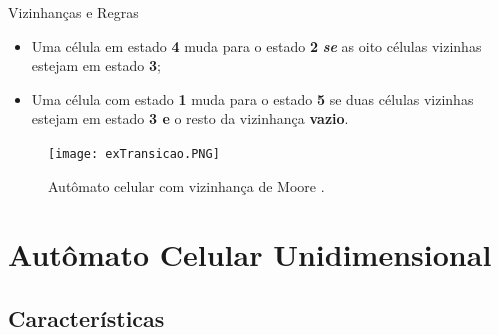 \documentclass[compress, hide notes]{beamer}
\begin{document}
    
\begin{frame}{Vizinhanças e Regras}
	
	\begin{minipage}[t]{0.38\linewidth}\centering

        \begin{itemize}

              \item Uma célula em estado \textbf{4}
              muda para o estado \textbf{2}
              \textit{\textbf{se}} as oito células vizinhas estejam em estado \textbf{3};
				\bigskip
              \item Uma célula com estado \textbf{1}
              muda para o estado \textbf{5}
              se duas células vizinhas estejam em estado \textbf{3 e} o resto da vizinhança \textbf{vazio}.

          \end{itemize}

	\end{minipage}\hfill
	\begin{minipage}[t]{0.58\linewidth}\centering
        
        \begin{figure}[h]
            \center
            \texttt{[image: exTransicao.PNG]}
            \caption{Autômato celular com vizinhança de Moore \cite{ufmg}.}
        \end{figure}
	\end{minipage}
	
\end{frame}
	
    
\section{Autômato Celular  Unidimensional}

\subsection{Características}
\end{document}
